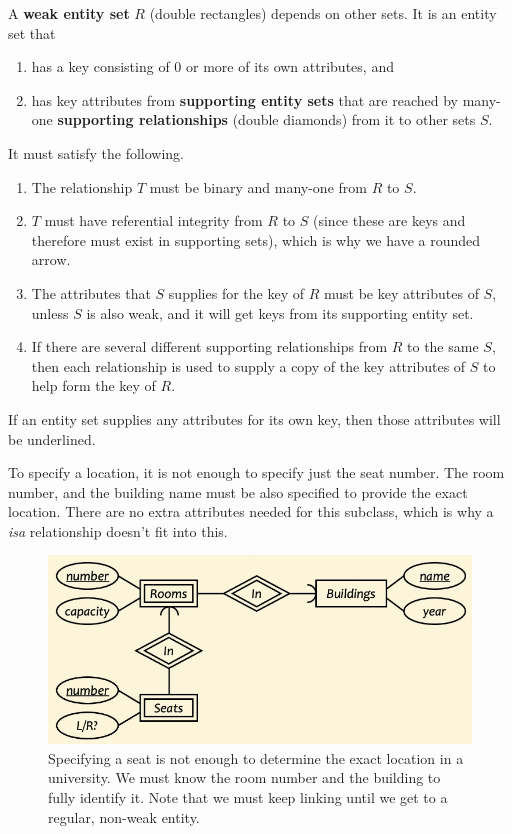 \documentclass{article}
\begin{document}
    \begin{definition}
      A \textbf{weak entity set} $R$ (double rectangles) depends on other sets. It is an entity set that 
      \begin{enumerate}
        \item has a key consisting of 0 or more of its own attributes, and 
        \item has key attributes from \textbf{supporting entity sets} that are reached by many-one \textbf{supporting relationships} (double diamonds) from it to other sets $S$. 
      \end{enumerate}
      It must satisfy the following. 
      \begin{enumerate}
        \item The relationship $T$ must be binary and many-one from $R$ to $S$. 
        \item $T$ must have referential integrity from $R$ to $S$ (since these are keys and therefore must exist in supporting sets), which is why we have a rounded arrow. 
        \item The attributes that $S$ supplies for the key of $R$ must be key attributes of $S$, unless $S$ is also weak, and it will get keys from its supporting entity set. 
        \item If there are several different supporting relationships from $R$ to the same $S$, then each relationship is used to supply a copy of the key attributes of $S$ to help form the key of $R$. 
      \end{enumerate}
      If an entity set supplies any attributes for its own key, then those attributes will be underlined. 
    \end{definition}

    \begin{example}
      To specify a location, it is not enough to specify just the seat number. The room number, and the building name must be also specified to provide the exact location. There are no extra attributes needed for this subclass, which is why a \textit{isa} relationship doesn't fit into this. 
      \begin{figure}[H]
        \centering 
        \includegraphics[scale=0.4]{img/weak_entity.png}
        \caption{Specifying a seat is not enough to determine the exact location in a university. We must know the room number and the building to fully identify it. Note that we must keep linking until we get to a regular, non-weak entity. } 
        \label{fig:weak_entity}
      \end{figure}
    \end{example}
\end{document}
